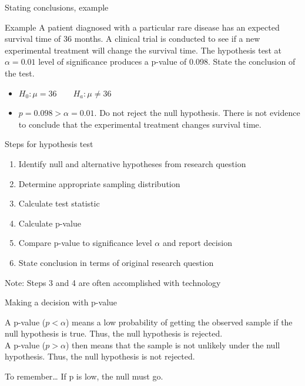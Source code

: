 \documentclass[xcolor=table, aspectratio=169, bigger, handout]{beamer}
\begin{document}
\begin{frame}{Stating conclusions, example}
\begin{exampleblock}{Example}
A patient diagnosed with a particular rare disease has an expected survival time of 36 months. A clinical trial is conducted to see if a new experimental treatment will change the survival time. The hypothesis test at $\alpha = 0.01$ level of significance produces a p-value of 0.098. State the conclusion of the test.
\begin{itemize}
\pause\item $H_0: \mu = 36 \qquad H_a: \mu \ne 36$
\pause\item $p=0.098 > \alpha = 0.01$. Do not reject the null hypothesis. There is not evidence to conclude that the experimental treatment changes survival time.
\end{itemize}\end{exampleblock}
\end{frame}

\begin{frame}{Steps for hypothesis test}
\begin{block}{}
\begin{enumerate}
\item Identify null and alternative hypotheses from research question
\item Determine appropriate sampling distribution
\item Calculate test statistic
\item Calculate p-value
\item Compare p-value to significance level $\alpha$ and report decision
\item State conclusion in terms of original research question
\end{enumerate}
Note: Steps 3 and 4 are often accomplished with technology
\end{block}
\end{frame}

\begin{frame}{Making a decision with p-value}
\begin{block}{}
A  p-value ($p < \alpha$) means a low probability of getting the observed sample if the null hypothesis is true. Thus, the null hypothesis is rejected.\\
\medskip
A  p-value ($p > \alpha$) then means that the sample is not unlikely under the null hypothesis. Thus, the null hypothesis is not rejected.
\end{block}

\pause
\begin{alertblock}{To remember\ldots}
\large If p is low, the null must go.
\end{alertblock}

\end{frame}
\end{document}
